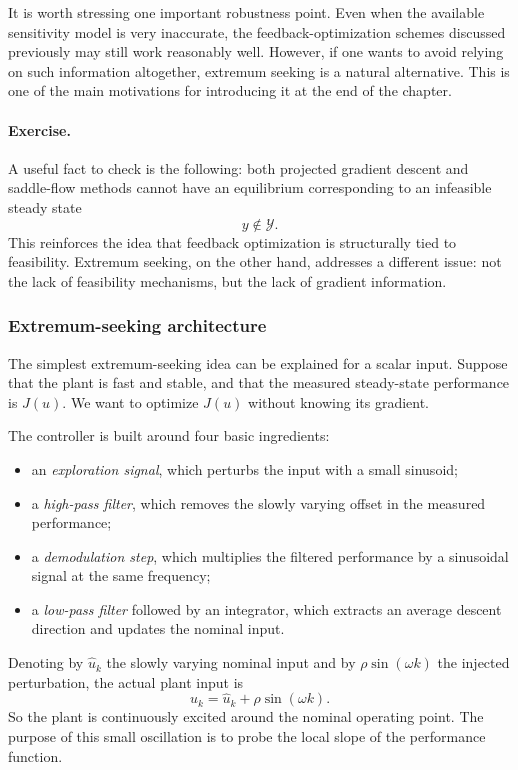 It is worth stressing one important robustness point. Even when the available sensitivity model is very inaccurate, the feedback-optimization schemes discussed previously may still work reasonably well. However, if one wants to avoid relying on such information altogether, extremum seeking is a natural alternative. This is one of the main motivations for introducing it at the end of the chapter.

\paragraph{Exercise.}
A useful fact to check is the following: both projected gradient descent and saddle-flow methods cannot have an equilibrium corresponding to an infeasible steady state
\[
y\notin\mathcal Y.
\]
This reinforces the idea that feedback optimization is structurally tied to feasibility. Extremum seeking, on the other hand, addresses a different issue: not the lack of feasibility mechanisms, but the lack of gradient information.

\subsubsection{Extremum-seeking architecture}

The simplest extremum-seeking idea can be explained for a scalar input. Suppose that the plant is fast and stable, and that the measured steady-state performance is $J(u)$. We want to optimize $J(u)$ without knowing its gradient.

The controller is built around four basic ingredients:
\begin{itemize}
    \item an \emph{exploration signal}, which perturbs the input with a small sinusoid;
    \item a \emph{high-pass filter}, which removes the slowly varying offset in the measured performance;
    \item a \emph{demodulation step}, which multiplies the filtered performance by a sinusoidal signal at the same frequency;
    \item a \emph{low-pass filter} followed by an integrator, which extracts an average descent direction and updates the nominal input.
\end{itemize}

Denoting by $\hat u_k$ the slowly varying nominal input and by $\rho \sin(\omega k)$ the injected perturbation, the actual plant input is
\[
u_k=\hat u_k+\rho \sin(\omega k).
\]
So the plant is continuously excited around the nominal operating point. The purpose of this small oscillation is to probe the local slope of the performance function.

